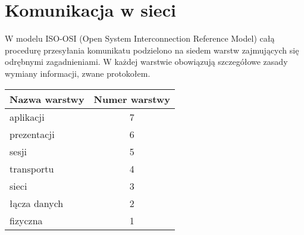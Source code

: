 \documentclass[a4paper,11pt]{article}
\begin{document}
 
\section*{Komunikacja w sieci}
W modelu ISO-OSI (Open System Interconnection Reference Model) całą procedurę przesyłania komunikatu podzielono na siedem warstw zajmujących się odrębnymi zagadnieniami. W każdej warstwie obowiązują szczegółowe zasady wymiany informacji, zwane protokołem.
\begin{table}[!htb]
\begin{center}
\begin{tabular}{| l | c |}
\hline Nazwa warstwy & Numer warstwy \\ \hline \hline
aplikacji & 7 \\ \hline
prezentacji & 6 \\ \hline
sesji & 5 \\ \hline \hline
transportu & 4 \\ \hline
sieci & 3 \\ \hline
łącza danych & 2 \\ \hline
fizyczna & 1 \\  \hline
\end{tabular}
\end{center}
\end{table}
\end{document}

